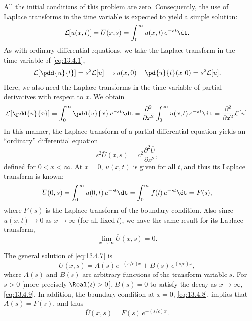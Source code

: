 All the initial conditions of this problem are zero.  Consequently, the use of Laplace transforms in the time variable is expected to yield a simple solution:
\[
\mathcal{L}[u(x,t)] = \overline{U}(x,s) = \int_0^{\infty} u(x,t)\,e^{-st}\dt.
\]
As with ordinary differential equations, we take the Laplace transform in the time variable of \eqref{eq:13.4.1},
\begin{equation}
\mathcal{L}\!\left[\pdd{u}{t}\right]
= s^2\mathcal{L}[u] - s\,u(x,0) - \pd{u}{t}(x,0)
= s^2\mathcal{L}[u].
\label{eq:13.4.5}
\end{equation}
Here, we also need the Laplace transforms in the time variable of partial derivatives with respect to $x$.  We obtain
\begin{equation}
\mathcal{L}\!\left[\pdd{u}{x}\right]
= \int_0^{\infty} \pdd{u}{x}\,e^{-st}\dt
= \frac{\partial^2}{\partial x^2}\int_0^{\infty} u(x,t)\,e^{-st}\dt
= \frac{\partial^2}{\partial x^2}\mathcal{L}[u].
\label{eq:13.4.6}
\end{equation}
In this manner, the Laplace transform of a partial differential equation yields an ``ordinary'' differential equation
\begin{equation}
s^2\overline{U}(x,s) = c^2\frac{\partial^2\overline{U}}{\partial x^2},
\label{eq:13.4.7}
\end{equation}
defined for $0 < x < \infty$.  At $x = 0$, $u(x,t)$ is given for all $t$, and thus its Laplace transform is known:
\begin{equation}
\overline{U}(0,s) = \int_0^{\infty} u(0,t)\,e^{-st}\dt
             = \int_0^{\infty} f(t)\,e^{-st}\dt = F(s),
\label{eq:13.4.8}
\end{equation}
where $F(s)$ is the Laplace transform of the boundary condition.  Also since $u(x,t) \to 0$ as $x \to \infty$ (for all fixed $t$), we have the same result for its Laplace transform,
\begin{equation}
\lim_{x\to\infty} \overline{U}(x,s) = 0.
\label{eq:13.4.9}
\end{equation}

The general solution of \eqref{eq:13.4.7} is
\[
\overline{U}(x,s) = A(s)\,e^{-(s/c)x} + B(s)\,e^{(s/c)x},
\]
where $A(s)$ and $B(s)$ are arbitrary functions of the transform variable $s$.  For $s > 0$ [more precisely $\Real(s) > 0$], $B(s) = 0$ to satisfy the decay as $x \to \infty$, \eqref{eq:13.4.9}.  In addition, the boundary condition at $x = 0$, \eqref{eq:13.4.8}, implies that $A(s) = F(s)$, and thus
\begin{equation}
\overline{U}(x,s) = F(s)\,e^{-(s/c)x}.
\label{eq:13.4.10}
\end{equation}

